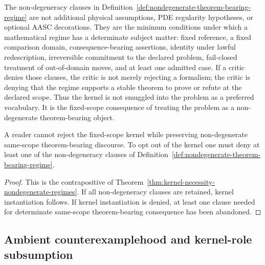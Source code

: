 \begin{tcolorbox}[breakable, title={Minimality note: these are theorem-bearing conditions, not extra PDE hypotheses}, colback=yellow!2!white, colframe=yellow!45!black]
The non-degeneracy clauses in Definition~\ref{def:nondegenerate-theorem-bearing-regime} are not additional physical assumptions, PDE regularity hypotheses, or optional AASC decorations. They are the minimum conditions under which a mathematical regime has a determinate subject matter: fixed reference, a fixed comparison domain, consequence-bearing assertions, identity under lawful redescription, irreversible commitment to the declared problem, fail-closed treatment of out-of-domain moves, and at least one admitted case. If a critic denies those clauses, the critic is not merely rejecting a formalism; the critic is denying that the regime supports a stable theorem to prove or refute at the declared scope. Thus the kernel is not smuggled into the problem as a preferred vocabulary. It is the fixed-scope consequence of treating the problem as a non-degenerate theorem-bearing object.
\end{tcolorbox}

\begin{manualcorollary}
\label{cor:no-framework-optout-nondegenerate}
A reader cannot reject the fixed-scope kernel while preserving non-degenerate same-scope theorem-bearing discourse. To opt out of the kernel one must deny at least one of the non-degeneracy clauses of Definition~\ref{def:nondegenerate-theorem-bearing-regime}.
\end{manualcorollary}

\begin{proof}
This is the contrapositive of Theorem~\ref{thm:kernel-necessity-nondegenerate-regimes}. If all non-degeneracy clauses are retained, kernel instantiation follows. If kernel instantiation is denied, at least one clause needed for determinate same-scope theorem-bearing consequence has been abandoned.
\end{proof}

\subsection*{Ambient counterexamplehood and kernel-role subsumption}
\label{subsec:ambient-counterexamplehood-kernel-subsumption}

